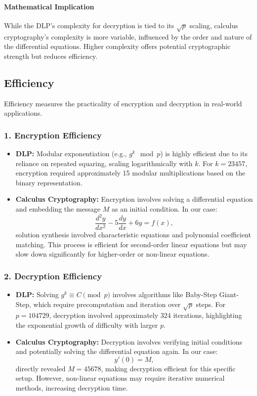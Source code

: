 \documentclass[12pt]{article}
\begin{document}
\paragraph*{Mathematical Implication}
While the DLP’s complexity for decryption is tied to its \( \sqrt{p} \) scaling, calculus cryptography’s complexity is more variable, influenced by the order and nature of the differential equations. Higher complexity offers potential cryptographic strength but reduces efficiency.

\subsection*{Efficiency}

Efficiency measures the practicality of encryption and decryption in real-world applications.

\subsubsection*{1. Encryption Efficiency}
\begin{itemize}
    \item \textbf{DLP:} Modular exponentiation (e.g., \( g^k \mod p \)) is highly efficient due to its reliance on repeated squaring, scaling logarithmically with \( k \). For \( k = 23457 \), encryption required approximately 15 modular multiplications based on the binary representation.
    \item \textbf{Calculus Cryptography:} Encryption involves solving a differential equation and embedding the message \( M \) as an initial condition. In our case:
    \[
    \frac{d^2y}{dx^2} - 5\frac{dy}{dx} + 6y = f(x),
    \]
    solution synthesis involved characteristic equations and polynomial coefficient matching. This process is efficient for second-order linear equations but may slow down significantly for higher-order or non-linear equations.
\end{itemize}

\subsubsection*{2. Decryption Efficiency}
\begin{itemize}
    \item \textbf{DLP:} Solving \( g^k \equiv C \pmod{p} \) involves algorithms like Baby-Step Giant-Step, which require precomputation and iteration over \( \sqrt{p} \) steps. For \( p = 104729 \), decryption involved approximately 324 iterations, highlighting the exponential growth of difficulty with larger \( p \).
    \item \textbf{Calculus Cryptography:} Decryption involves verifying initial conditions and potentially solving the differential equation again. In our case:
    \[
    y'(0) = M,
    \]
    directly revealed \( M = 45678 \), making decryption efficient for this specific setup. However, non-linear equations may require iterative numerical methods, increasing decryption time.
\end{itemize}
\end{document}

